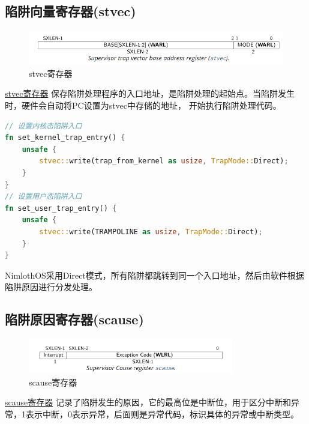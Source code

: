 \subsection{陷阱向量寄存器(stvec)}

\begin{figure}[htbp]
    \centering
    \includegraphics[width=1.0\textwidth]{../image/stvec.png}
    \caption{stvec寄存器}
    \label{fig:stvec}
\end{figure}

\href{https://five-embeddev.com/riscv-priv-isa-manual/Priv-v1.12/supervisor.html#supervisor-trap-vector-base-address-register-stvec}{stvec寄存器}
保存陷阱处理程序的入口地址，是陷阱处理的起始点。当陷阱发生时，硬件会自动将PC设置为stvec中存储的地址，
开始执行陷阱处理代码。

\begin{lstlisting}[language=Rust,caption={陷阱向量寄存器设置}, label={lst:stvec-setup}]
// 设置内核态陷阱入口
fn set_kernel_trap_entry() {
    unsafe {
        stvec::write(trap_from_kernel as usize, TrapMode::Direct);
    }
}
// 设置用户态陷阱入口  
fn set_user_trap_entry() {
    unsafe {
        stvec::write(TRAMPOLINE as usize, TrapMode::Direct);
    }
}
\end{lstlisting}

NimlothOS采用Direct模式，所有陷阱都跳转到同一个入口地址，然后由软件根据陷阱原因进行分发处理。

\subsection{陷阱原因寄存器(scause)}

\begin{figure}[htbp]
    \centering
    \includegraphics[width=0.8\textwidth]{../image/scause.png}
    \caption{scause寄存器}
    \label{fig:scause}
\end{figure}

\href{https://five-embeddev.com/riscv-priv-isa-manual/Priv-v1.12/supervisor.html#sec:scause}{scause寄存器}
记录了陷阱发生的原因，它的最高位是中断位，用于区分中断和异常，1表示中断，0表示异常，后面则是异常代码，标识具体的异常或中断类型。

